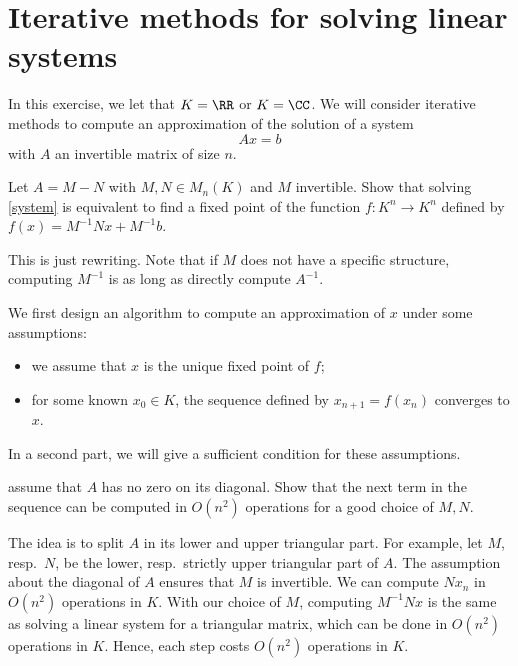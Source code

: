 \documentclass[11pt]{exam}
\theoremstyle{definition}
\begin{document}
{\section{Iterative methods for solving linear systems}

In this exercise, we let that $K = \RR$ or $K = \CC$. We will consider iterative methods to compute an approximation of the solution of a system 
\begin{equation}
\label{system}
Ax = b
\end{equation}
with $A$ an invertible matrix of size $n$.

\begin{questions}
	
	\question
	\label{qu_1}
	Let $A = M-N$ with $M,N \in M_n(K)$ and $M$ invertible. Show that solving \eqref{system} is equivalent to find a fixed point of the function $f : K^n \rightarrow K^n$ defined by $f(x) = M^{-1}Nx  + M^{-1}b$.
	
	\begin{solution}
		This is just rewriting. Note that if $M$ does not have a specific structure, computing $M^{-1}$ is as long as directly compute $A^{-1}$.
	\end{solution}

        We first design an algorithm to compute an approximation of $x$ under some assumptions: \begin{itemize}
        \item we assume that $x$ is the unique fixed point of $f$;
        \item for some known $x_0 \in K$, the sequence defined by $x_{n+1}=f(x_n)$ converges to $x$.
        \end{itemize}
        In a second part, we will give a sufficient condition for these assumptions. 

         assume that $A$ has no zero on its diagonal. Show that the next term in the sequence can be computed in $O(n^2)$ operations for a good choice of $M,N$.
        \begin{solution}
          The idea is to split $A$ in its lower and upper triangular part. For example, let $M$, resp.~$N$, be the lower, resp.~strictly upper triangular part of $A$. The assumption about the diagonal of $A$ ensures that $M$ is invertible. We can compute $Nx_n$ in $O(n^2)$ operations in $K$. With our choice of $M$, computing $M^{-1} Nx$ is the same as solving a linear system for a triangular matrix, which can be done in $O(n^2)$ operations in $K$. Hence, each step costs $O(n^2)$ operations in $K$.
        \end{solution}


\end{questions}}
\end{document}
